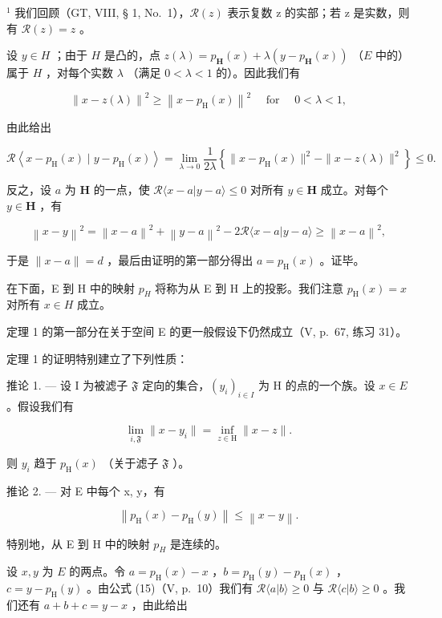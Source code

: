 \(^{1}\) 我们回顾（GT, VIII, § 1, No.~1），\(\mathcal{R}(z)\) 表示复数 z 的实部；若 z 是实数，则有 \(\mathcal{R}(z)=z\) 。

设 \(y \in H\) ；由于 \(H\) 是凸的，点 \(z(\lambda) = p_{\mathbf{H}}(x) + \lambda(y - p_{\mathbf{H}}(x))\) （\(E\) 中的）属于 \(H\) ，对每个实数 \(\lambda\) （满足 \(0 < \lambda < 1\) 的）。因此我们有

\[
\left\| x - z (\lambda) \right\| ^ {2} \geqslant \left\| x - p _ {\mathrm{H}} (x) \right\| ^ {2} \quad \text { for } \quad 0 <   \lambda <   1,
\]

由此给出

\[
\mathcal {R} \left\langle x - p _ {\mathrm{H}} (x) \mid y - p _ {\mathrm{H}} (x) \right\rangle = \lim _ {\lambda \rightarrow 0} \frac {1}{2 \lambda} \left\{\| x - p _ {\mathrm{H}} (x) \| ^ {2} - \| x - z (\lambda) \| ^ {2} \right\} \leqslant 0.
\]

反之，设 \(a\) 为 \(\mathbf{H}\) 的一点，使 \(\mathcal{R}\langle x - a|y - a\rangle \leqslant 0\) 对所有 \(y\in \mathbf{H}\) 成立。对每个 \(y\in \mathbf{H}\) ，有

\[
\left\| x - y \right\| ^ {2} = \left\| x - a \right\| ^ {2} + \left\| y - a \right\| ^ {2} - 2 \mathcal {R} \langle x - a | y - a \rangle \geqslant \left\| x - a \right\| ^ {2},
\]

于是 \(\| x - a\| = d\) ，最后由证明的第一部分得出 \(a = p_{\mathrm{H}}(x)\) 。证毕。

在下面，E 到 H 中的映射 \(p_{H}\) 将称为从 E 到 H 上的投影。我们注意 \(p_{\mathrm{H}}(x)=x\) 对所有 \(x\in H\) 成立。

定理 1 的第一部分在关于空间 E 的更一般假设下仍然成立（V, p.~67, 练习 31）。

定理 1 的证明特别建立了下列性质：

推论 1. --- 设 I 为被滤子 \(\mathfrak{F}\) 定向的集合，\((y_i)_{i\in I}\) 为 H 的点的一个族。设 \(x\in E\) 。假设我们有

\[
\lim _ {i, \mathfrak {F}} \| x - y _ {i} \| = \inf _ {z \in \mathrm{H}} \| x - z \|.
\]

则 \(y_{i}\) 趋于 \(p_{\mathrm{H}}(x)\) （关于滤子 \(\mathfrak{F}\) ）。

推论 2. --- 对 E 中每个 x, y，有

\[
\left\| p _ {\mathrm{H}} (x) - p _ {\mathrm{H}} (y) \right\| \leqslant \left\| x - y \right\|.
\]

特别地，从 E 到 H 中的映射 \(p_{H}\) 是连续的。

设 \(x, y\) 为 \(E\) 的两点。令 \(a = p_{\mathrm{H}}(x) - x\) ，\(b = p_{\mathrm{H}}(y) - p_{\mathrm{H}}(x)\) ，\(c = y - p_{\mathrm{H}}(y)\) 。由公式 (15)（V, p.~10）我们有 \(\mathcal{R}\langle a|b\rangle \geqslant 0\) 与 \(\mathcal{R}\langle c|b\rangle \geqslant 0\) 。我们还有 \(a + b + c = y - x\) ，由此给出

